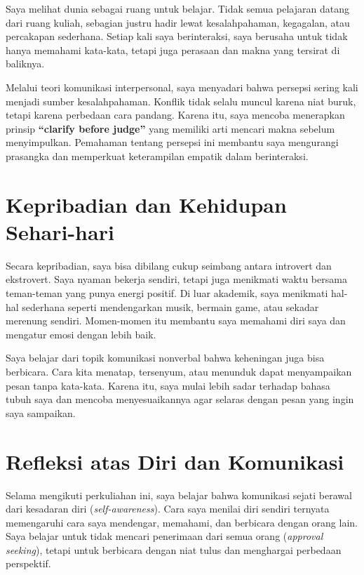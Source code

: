\documentclass[
  letterpaper,
  DIV=11,
  numbers=noendperiod]{scrreprt}
\begin{document}
Saya melihat dunia sebagai ruang untuk belajar. Tidak semua pelajaran
datang dari ruang kuliah, sebagian justru hadir lewat kesalahpahaman,
kegagalan, atau percakapan sederhana. Setiap kali saya berinteraksi,
saya berusaha untuk tidak hanya memahami kata-kata, tetapi juga perasaan
dan makna yang tersirat di baliknya.

Melalui teori komunikasi interpersonal, saya menyadari bahwa persepsi
sering kali menjadi sumber kesalahpahaman. Konflik tidak selalu muncul
karena niat buruk, tetapi karena perbedaan cara pandang. Karena itu,
saya mencoba menerapkan prinsip \textbf{``clarify before judge''} yang
memiliki arti mencari makna sebelum menyimpulkan. Pemahaman tentang
persepsi ini membantu saya mengurangi prasangka dan memperkuat
keterampilan empatik dalam berinteraksi.

\section{Kepribadian dan Kehidupan
Sehari-hari}\label{kepribadian-dan-kehidupan-sehari-hari}

Secara kepribadian, saya bisa dibilang cukup seimbang antara introvert
dan ekstrovert. Saya nyaman bekerja sendiri, tetapi juga menikmati waktu
bersama teman-teman yang punya energi positif. Di luar akademik, saya
menikmati hal-hal sederhana seperti mendengarkan musik, bermain game,
atau sekadar merenung sendiri. Momen-momen itu membantu saya memahami
diri saya dan mengatur emosi dengan lebih baik.

Saya belajar dari topik komunikasi nonverbal bahwa keheningan juga bisa
berbicara. Cara kita menatap, tersenyum, atau menunduk dapat
menyampaikan pesan tanpa kata-kata. Karena itu, saya mulai lebih sadar
terhadap bahasa tubuh saya dan mencoba menyesuaikannya agar selaras
dengan pesan yang ingin saya sampaikan.

\section{Refleksi atas Diri dan
Komunikasi}\label{refleksi-atas-diri-dan-komunikasi}

Selama mengikuti perkuliahan ini, saya belajar bahwa komunikasi sejati
berawal dari kesadaran diri (\emph{self-awareness}). Cara saya menilai
diri sendiri ternyata memengaruhi cara saya mendengar, memahami, dan
berbicara dengan orang lain. Saya belajar untuk tidak mencari penerimaan
dari semua orang (\emph{approval seeking}), tetapi untuk berbicara
dengan niat tulus dan menghargai perbedaan perspektif.
\end{document}
